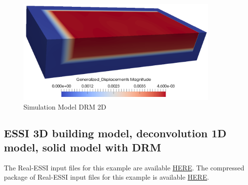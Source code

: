 \begin{figure}[H]
  \centering
  \includegraphics[width = 10cm]{./Figure-files/Day1/Preprocess_examples_with_Gmsh/example4/DRM3D_results.png}
  \caption{Simulation Model DRM 2D}
  \label{fig_day2_DRM3D_results}
\end{figure}



\clearpage
\newpage
\subsection{ESSI 3D building model, deconvolution 1D model, solid model with DRM}
\label{Earthquake_Soil-Structure_Interaction_3D_Model_with_DRM1}

The Real-ESSI input files for this example are available 
\href{http://sokocalo.engr.ucdavis.edu/~jeremic/lecture_notes_online_material/_Chapter_Short_Course_Examples/Day2/Deconvolution_1D_Motions/Earthquake_Soil-Structure_Interaction_3D_Model_with_DRM}{HERE}. 
The compressed package of Real-ESSI input files for this example is available 
\href{http://sokocalo.engr.ucdavis.edu/~jeremic/lecture_notes_online_material/_Chapter_Short_Course_Examples/Day2/Deconvolution_1D_Motions/Earthquake_Soil-Structure_Interaction_3D_Model_with_DRM/_all_files_packaged_for_Earthquake_Soil-Structure_Interaction_3D_Model_with_DRM.tar.gz}{HERE}. 

